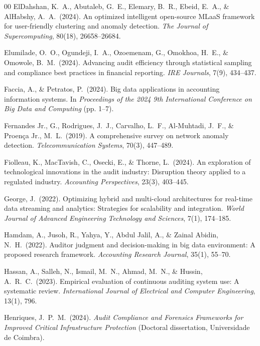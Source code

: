 \documentclass[preprint,12pt]{elsarticle}
\begin{document}
\begin{thebibliography}{00}
 ElDahshan, K.\ A., Abutaleb, G.\ E., Elemary, B.\ R., Ebeid, E.\ A., \& AlHabshy, A.\ A.\ (2024). An optimized intelligent open-source MLaaS framework for user-friendly clustering and anomaly detection. \emph{The Journal of Supercomputing}, 80(18), 26658--26684.

 Elumilade, O.\ O., Ogundeji, I.\ A., Ozoemenam, G., Omokhoa, H.\ E., \& Omowole, B.\ M.\ (2024). Advancing audit efficiency through statistical sampling and compliance best practices in financial reporting. \emph{IRE Journals}, 7(9), 434--437.

 Faccia, A., \& Petratos, P.\ (2024). Big data applications in accounting information systems. In \emph{Proceedings of the 2024 9th International Conference on Big Data and Computing} (pp. 1--7).

 Fernandes Jr., G., Rodrigues, J.\ J., Carvalho, L.\ F., Al-Muhtadi, J.\ F., \& Proen\c{c}a Jr., M.\ L.\ (2019). A comprehensive survey on network anomaly detection. \emph{Telecommunication Systems}, 70(3), 447--489.

 Fiolleau, K., MacTavish, C., Osecki, E., \& Thorne, L.\ (2024). An exploration of technological innovations in the audit industry: Disruption theory applied to a regulated industry. \emph{Accounting Perspectives}, 23(3), 403--445.

 George, J.\ (2022). Optimizing hybrid and multi-cloud architectures for real-time data streaming and analytics: Strategies for scalability and integration. \emph{World Journal of Advanced Engineering Technology and Sciences}, 7(1), 174--185.

 Hamdam, A., Jusoh, R., Yahya, Y., Abdul Jalil, A., \& Zainal Abidin, N.\ H.\ (2022). Auditor judgment and decision-making in big data environment: A proposed research framework. \emph{Accounting Research Journal}, 35(1), 55--70.

 Hassan, A., Salleh, N., Ismail, M.\ N., Ahmad, M.\ N., \& Hussin, A.\ R.\ C.\ (2023). Empirical evaluation of continuous auditing system use: A systematic review. \emph{International Journal of Electrical and Computer Engineering}, 13(1), 796.

 Henriques, J.\ P.\ M.\ (2024). \emph{Audit Compliance and Forensics Frameworks for Improved Critical Infrastructure Protection} (Doctoral dissertation, Universidade de Coimbra).


\end{thebibliography}
\end{document}
